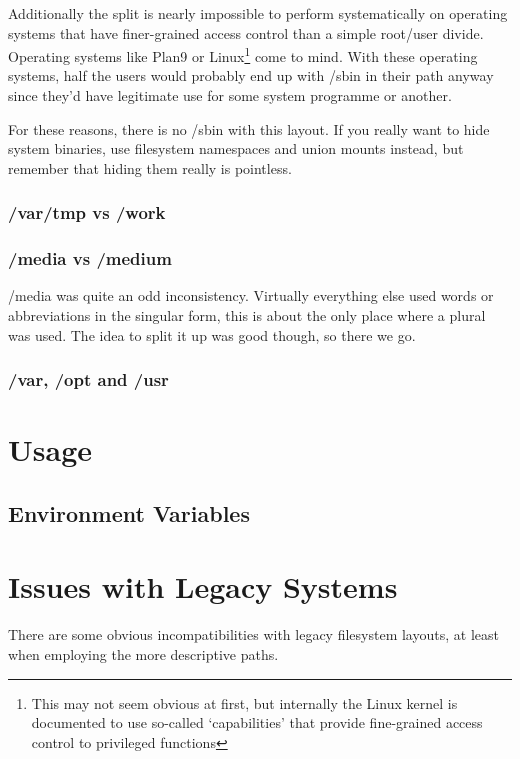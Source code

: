 \documentclass[a4paper,twoside,titlepage]{article}
\begin{document}
Additionally the split is nearly impossible to perform systematically on
operating systems that have finer-grained access control than a simple root/user
divide. Operating systems like Plan9 or Linux\footnote{This may not seem obvious
at first, but internally the Linux kernel is documented to use so-called
`capabilities' that provide fine-grained access control to privileged functions}
come to mind. With these operating systems, half the users would probably end up
with /sbin in their path anyway since they'd have legitimate use for some system
programme or another.

For these reasons, there is no /sbin with this layout. If you really want to
hide system binaries, use filesystem namespaces and union mounts instead, but
remember that hiding them really is pointless.

\subsubsection{/var/tmp vs /work}

\subsubsection{/media vs /medium}
/media was quite an odd inconsistency. Virtually everything else used words or
abbreviations in the singular form, this is about the only place where a plural
was used. The idea to split it up was good though, so there we go.

\subsubsection{/var, /opt and /usr}

\newpage

\section{Usage}

\subsection{Environment Variables}

\newpage

\section{Issues with Legacy Systems}
There are some obvious incompatibilities with legacy filesystem layouts, at
least when employing the more descriptive paths.
\end{document}
